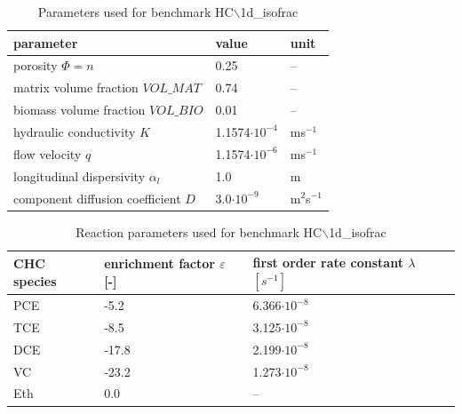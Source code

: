 \begin{table}[htbp]
\caption{Parameters used for benchmark HC$\backslash$1d\_isofrac }
\centering
\begin{tabular}{|l|l|l|}
\hline
parameter & value & unit \\
\hline
porosity $\Phi = n $  & 0.25 &  --  \\			
\hline
matrix volume fraction $VOL\_MAT $  & 0.74 &  --  \\			
\hline
biomass volume fraction $VOL\_BIO $  & 0.01 &  --  \\			
\hline
hydraulic conductivity $K$ & 1.1574$\cdot 10^{-4}$ & ms$^{-1}$ \\
\hline
flow velocity $q$ & 1.1574$\cdot 10^{-6}$ & ms$^{-1}$ \\
\hline
longitudinal dispersivity $\alpha_l$ & 1.0 & m \\
\hline
component diffusion coefficient $D$ & 3.0$\cdot 10^{-9}$ & m$^2$s$^{-1}$ \\
\hline
\end{tabular}
\label{l_tab_benchmark_isofrac_flow}
\end{table}


\begin{table}[htbp]
\caption{Reaction parameters used for benchmark HC$\backslash$1d\_isofrac }
\centering
\begin{tabular}{|l|l|l|}
\hline
CHC species & enrichment factor $\varepsilon$ [-] & first order rate constant $\lambda $ $[s^{-1}]$ \\
\hline
PCE & -5.2 & 6.366$\cdot 10^{-8}$ \\
\hline
TCE & -8.5 & 3.125$\cdot 10^{-8}$ \\
\hline
DCE &  -17.8 & 2.199$\cdot 10^{-8}$ \\
\hline
VC & -23.2 & 1.273$\cdot 10^{-8}$ \\
\hline
Eth & 0.0 & -- \\	
\hline
\end{tabular}
\label{l_tab_benchmark_isofrac_react}
\end{table}


